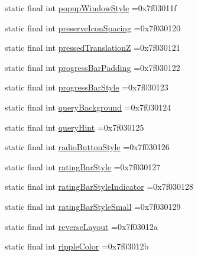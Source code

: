 \begin{DoxyCompactItemize}
\item 
static final int \mbox{\hyperlink{classbr_1_1unb_1_1cic_1_1mp_1_1marketmaster_1_1R_1_1attr_a471c12ce7525e0e1f1786c3eb5d1c524}{popup\+Window\+Style}} =0x7f03011f
\item 
static final int \mbox{\hyperlink{classbr_1_1unb_1_1cic_1_1mp_1_1marketmaster_1_1R_1_1attr_a59aa688dbe10701b8abfad303708a489}{preserve\+Icon\+Spacing}} =0x7f030120
\item 
static final int \mbox{\hyperlink{classbr_1_1unb_1_1cic_1_1mp_1_1marketmaster_1_1R_1_1attr_a4e730e646e2c38ab7fbadcfaabd5ee60}{pressed\+TranslationZ}} =0x7f030121
\item 
static final int \mbox{\hyperlink{classbr_1_1unb_1_1cic_1_1mp_1_1marketmaster_1_1R_1_1attr_af4de6bdde71c03943766f260bf692d24}{progress\+Bar\+Padding}} =0x7f030122
\item 
static final int \mbox{\hyperlink{classbr_1_1unb_1_1cic_1_1mp_1_1marketmaster_1_1R_1_1attr_a62eddc1833bde54df1550a29da86c41a}{progress\+Bar\+Style}} =0x7f030123
\item 
static final int \mbox{\hyperlink{classbr_1_1unb_1_1cic_1_1mp_1_1marketmaster_1_1R_1_1attr_a3dfc072d87e7630e3576bb51e1eb50d1}{query\+Background}} =0x7f030124
\item 
static final int \mbox{\hyperlink{classbr_1_1unb_1_1cic_1_1mp_1_1marketmaster_1_1R_1_1attr_a56cbabb9d8c458f41832e1e05ff55cbd}{query\+Hint}} =0x7f030125
\item 
static final int \mbox{\hyperlink{classbr_1_1unb_1_1cic_1_1mp_1_1marketmaster_1_1R_1_1attr_ad07e42f1008dbf16455f2d16921688c9}{radio\+Button\+Style}} =0x7f030126
\item 
static final int \mbox{\hyperlink{classbr_1_1unb_1_1cic_1_1mp_1_1marketmaster_1_1R_1_1attr_a54143ca85a329c2218befc2c025fb809}{rating\+Bar\+Style}} =0x7f030127
\item 
static final int \mbox{\hyperlink{classbr_1_1unb_1_1cic_1_1mp_1_1marketmaster_1_1R_1_1attr_a70b0850e89145a156c41ff41530fc79c}{rating\+Bar\+Style\+Indicator}} =0x7f030128
\item 
static final int \mbox{\hyperlink{classbr_1_1unb_1_1cic_1_1mp_1_1marketmaster_1_1R_1_1attr_aa25cd2149048680a00d82e35044a3b25}{rating\+Bar\+Style\+Small}} =0x7f030129
\item 
static final int \mbox{\hyperlink{classbr_1_1unb_1_1cic_1_1mp_1_1marketmaster_1_1R_1_1attr_a6409a444b0f9b172a414ea7f779f77a6}{reverse\+Layout}} =0x7f03012a
\item 
static final int \mbox{\hyperlink{classbr_1_1unb_1_1cic_1_1mp_1_1marketmaster_1_1R_1_1attr_a978243a13f1c4588547667ca78953f19}{ripple\+Color}} =0x7f03012b

\end{DoxyCompactItemize}

